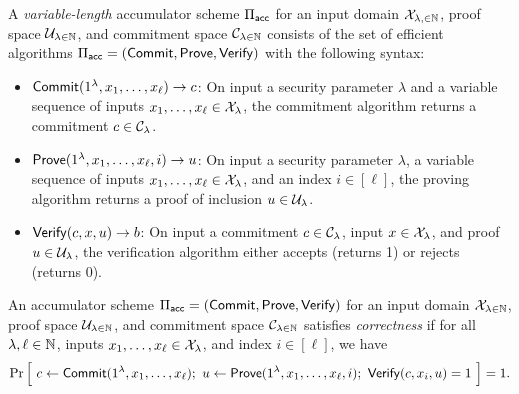 \newcommand{\Piacc}{\Pi_\ms{acc}}

\begin{definition}[Accumulator]
    A \emph{variable-length} accumulator scheme $\Piacc$ for an input domain
    $\mathcal{X}_{\lambda, \in \mathbb{N}}$, proof space $\mathcal{U}_{\lambda \in \mathbb{N}}$, and commitment space
    $\mathcal{C}_{\lambda \in \mathbb{N}}$ consists of the set of efficient algorithms
    $\Piacc = (\Commit, \Prove,
    \allowbreak \Verify)$ with the following syntax:
    \begin{itemize}
        \item $\mathsf{Commit}(1^\lambda, x_1, \ldots, x_\ell) \to c$: On input a
            security parameter $\lambda$ and a variable sequence of inputs
            $x_1, \ldots, x_\ell \in \mathcal{X}_\lambda$, the commitment algorithm
            returns a commitment $c \in \mathcal{C}_\lambda$.

        \item $\mathsf{Prove}(1^\lambda, x_1, \ldots, x_\ell, i) \to u$: On input a
            security parameter $\lambda$, a variable sequence of inputs $x_1,
            \ldots, x_\ell \in \mathcal{X}_\lambda$, and an index $i \in [\ell]$, the
            proving algorithm returns a proof of inclusion $u \in \mathcal{U}_\lambda$.

        \item $\mathsf{Verify}(c, x, u) \to b$: On input a commitment $c \in
            \mathcal{C}_\lambda$, input $x \in \mathcal{X}_\lambda$, and proof $u \in
            \mathcal{U}_\lambda$, the verification algorithm either accepts (returns
            1) or rejects (returns 0).
    \end{itemize}
\end{definition}

\begin{definition}[Correctness]
    An accumulator scheme $\Piacc = (\Commit, \Prove, \Verify)$ for an input
    domain $\mathcal{X}_{\lambda \in \mathbb{N}}$, proof space $\mathcal{U}_{\lambda \in \mathbb{N}}$, and
    commitment space $\mathcal{C}_{\lambda \in \mathbb{N}}$ satisfies \emph{correctness} if
    for all $\lambda, \ell \in \mathbb{N}$, inputs $x_1, \ldots, x_\ell \in
    \mathcal{X}_\lambda$, and index $i \in [\ell]$, we have
    \[ \Pr \Big[~ c \gets \mathsf{Commit}(1^\lambda, x_1, \ldots, x_\ell) ;~ u \gets
        \mathsf{Prove}(1^\lambda, x_1, \ldots, x_\ell, i) ;~ \mathsf{Verify}(c, x_i, u) = 1
        ~\Big] = 1 .\]
\end{definition}

\newcommand{\polylog}{\ms{polylog}}
\newcommand{\len}{\ms{len}}
\newcommand{\logg}{{\ms{log}}}

